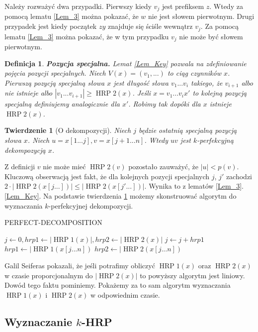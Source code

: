 \documentclass{article}
\newtheorem{definition}{Definicja}[section]
\newtheorem{theorem}{Twierdzenie}[section]
\DeclareMathOperator{\HRP}{HRP}
\begin{document}
Należy rozważyć dwa przypadki. Pierwszy kiedy $v_j$ jest prefiksem $z$. Wtedy za pomocą lematu \ref{Lem_3} można pokazać, że $w$ nie jest słowem pierwotnym.
Drugi przypadek jest kiedy początek $z y$ znajduje się ściśle wewnątrz $v_j$. 
Za pomocą lematu \ref{Lem_3} można pokazać, że w tym przypadku $v_j$ nie może być słowem pierwotnym.

\begin{definition}
\textbf{\textit{Pozycja specjalna.}} Lemat \ref{Lem_Key} pozwala na zdefiniowanie pojęcia pozycji specjalnych. Niech $V(x) = (v_1, ...)$ to ciąg czynników $x$. Pierwszą pozycją specjalną słowa $x$ jest długość słowa $v_1...v_i$ takiego, że $v_{i+1}$ albo nie istnieje albo $|v_1...v_{i+1}| \geq \HRP2(x)$. Jeśli $x = v_1...v_i x'$ to kolejną pozycją specjalną definiujemy analogicznie dla $x'$. Robimy tak dopóki dla $x$ istnieje $\HRP2(x)$.
\end{definition}

\begin{theorem}[O dekompozycji]\label{Th_Decomposition}
Niech $j$ będzie ostatnią specjalną pozycją słowa $x$.
Niech $u = x[1...j], v=x[j+1...n]$. Wtedy $uv$ jest $k$-perfekcyjną dekompozycją $x$.
\end{theorem}
Z definicji $v$ nie może mieć $\HRP2(v)$ pozostało zauważyć, że $|u| < p(v)$.
Kluczową obserwacją jest fakt, że dla kolejnych pozycji specjalnych $j$, $j'$ zachodzi $2\cdot |\HRP2(x[j...])| \leq |\HRP2(x[j'...])|$. Wynika to z lematów \ref{Lem_3}. \ref{Lem_Key}.
Na podstawie twierdzenia \ref{Th_Decomposition} możemy skonstruować algorytm do wyznaczania $k$-perfekcyjnej dekompozycji.
\begin{algorithm}[H]
\caption{PERFECT-DECOMPOSITION}
\label{perfect_decomposition}
\begin{algorithmic} 
\STATE $j \gets 0, hrp1 \gets |\HRP1(x)|, hrp2 \gets |\HRP2(x)|$
    \STATE $j \gets j + hrp1$
    \STATE $hrp1 \gets |\HRP1(x[j...n])$
        \STATE $hrp2 \gets|\HRP2(x[j...n])$
    \ENDIF
\ENDWHILE
\end{algorithmic}
\end{algorithm}

Galil Seiferas pokazali, że jeśli potrafimy obliczyć $\HRP1(x)$ oraz $\HRP2(x)$ w czasie proporcjonalnym do $|\HRP2(x)|$ to powyższy algorytm jest liniowy. Dowód tego faktu pominiemy.
Pokażemy za to sam algorytm wyznaczania $\HRP1(x)$ i $\HRP2(x)$ w odpowiednim czasie.

\subsection{Wyznaczanie $k$-HRP}
\end{document}
